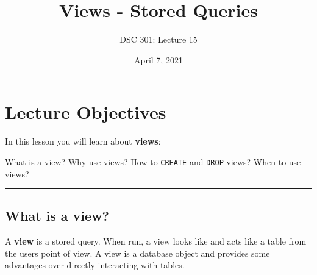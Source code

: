 \documentclass{article}
\newtheorem{definition}{Definition}
\begin{document}
\title{Views - Stored Queries}
\author{DSC 301: Lecture 15}
\date{April 7, 2021} %
\maketitle





\begin{outline}[enumerate]

\end{outline}
\begin{outline}
        
\end{outline}



\section*{Lecture Objectives}
\noindent In this lesson you will learn about \textbf{views}: %

\begin{outline}
        \1  What is a view?
        \1  Why use views?
        \1  How to \texttt{CREATE} and \texttt{DROP} views?
        \1 When to use views?
\end{outline}

\hspace{-0.5cm}\rule[-0.101in]{\textwidth}{0.0025in}
% 
% 









\subsection*{What is a view?}
A \textbf{view} is a stored query. When run, a view looks like and acts like a table from the users point of view. A view is a database object and provides some advantages over directly interacting with tables. 
 
\end{document}
